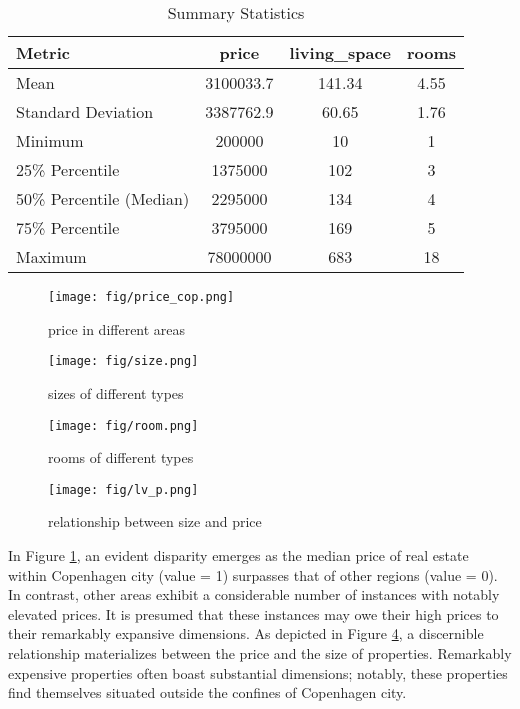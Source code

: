 \documentclass[12pt]{article} %
\begin{document}
{        \begin{table}[htbp]
        \centering
        \begin{tabular}{lccc}
        \toprule
        Metric & price & living\_space & rooms \\
        \midrule
        Mean & 3100033.7 & 141.34 & 4.55 \\
        Standard Deviation & 3387762.9 & 60.65 & 1.76 \\
        Minimum & 200000 & 10 & 1 \\
        25\% Percentile & 1375000 & 102 & 3 \\
        50\% Percentile (Median) & 2295000 & 134 & 4 \\
        75\% Percentile & 3795000 & 169 & 5 \\
        Maximum & 78000000 & 683 & 18 \\
        \bottomrule
        \end{tabular}
        \caption{Summary Statistics}
        \label{tab:summary_stats}
        \end{table}

        \begin{figure}[]
            \centering
            \texttt{[image: fig/price\_cop.png]}
            \caption{price in different areas}
            \label{fig:price_cop}
        \end{figure}

        \begin{figure}[]
            \centering
            \texttt{[image: fig/size.png]}
            \caption{sizes of different types}
            \label{fig:size_type}
        \end{figure}

        \begin{figure}[]
            \centering
            \texttt{[image: fig/room.png]}
            \caption{rooms of different types}
            \label{fig:room_type}
        \end{figure}

        \begin{figure}[]
            \centering
            \texttt{[image: fig/lv\_p.png]}
            \caption{relationship between size and price}
            \label{fig:price_size}
        \end{figure}

        In Figure \ref{fig:price_cop}, an evident disparity emerges as the median price of real estate within Copenhagen city (value = 1) surpasses that of other regions (value = 0). In contrast, other areas exhibit a considerable number of instances with notably elevated prices. It is presumed that these instances may owe their high prices to their remarkably expansive dimensions. As depicted in Figure \ref{fig:price_size}, a discernible relationship materializes between the price and the size of properties. Remarkably expensive properties often boast substantial dimensions; notably, these properties find themselves situated outside the confines of Copenhagen city.


}
\end{document}
